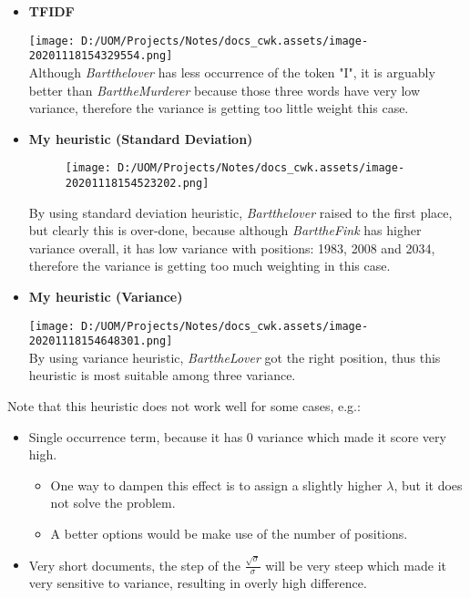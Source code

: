 \documentclass[
]{article}
\begin{document}
\begin{itemize}
\item
  \textbf{TFIDF}

  \texttt{[image: D:/UOM/Projects/Notes/docs\_cwk.assets/image-20201118154329554.png]}\\
  Although \emph{Bart\emph{the}lover} has less occurrence of the token
  "I", it is arguably better than \emph{Bart\emph{the}Murderer} because
  those three words have very low variance, therefore the variance is
  getting too little weight this case.
\item
  \textbf{My heuristic (Standard Deviation)}

  \begin{figure}
  \centering
  \texttt{[image: D:/UOM/Projects/Notes/docs\_cwk.assets/image-20201118154523202.png]}
  \caption{}
  \end{figure}

  By using standard deviation heuristic, \emph{Bart\emph{the}lover}
  raised to the first place, but clearly this is over-done, because
  although \emph{Bart\emph{the}Fink} has higher variance overall, it has
  low variance with positions: 1983, 2008 and 2034, therefore the
  variance is getting too much weighting in this case.
\item
  \textbf{My heuristic (Variance)}

  \texttt{[image: D:/UOM/Projects/Notes/docs\_cwk.assets/image-20201118154648301.png]}\\
  By using variance heuristic, \emph{Bart\emph{the}Lover} got the right
  position, thus this heuristic is most suitable among three variance.
\end{itemize}

Note that this heuristic does not work well for some cases, e.g.:

\begin{itemize}
\item
  Single occurrence term, because it has 0 variance which made it score
  very high.

  \begin{itemize}
  \item
    One way to dampen this effect is to assign a slightly higher
    \(\lambda\), but it does not solve the problem.
  \item
    A better options would be make use of the number of positions.
  \end{itemize}
\item
  Very short documents, the step of the \(\frac{\sqrt{\sigma}}{\sigma}\)
  will be very steep which made it very sensitive to variance, resulting
  in overly high difference.
\end{itemize}
\end{document}
